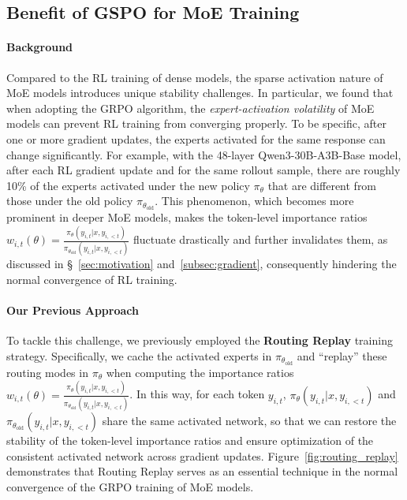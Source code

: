 \subsection{Benefit of GSPO for MoE Training}
\label{subsec:routing_replay}

\paragraph{Background}
Compared to the RL training of dense models, the sparse activation nature of MoE models introduces unique stability challenges. In particular, we found that when adopting the GRPO algorithm, the \textit{expert-activation volatility} of MoE models can prevent RL training from converging properly. To be specific, after one or more gradient updates, the experts activated for the same response can change significantly. For example, with the 48-layer Qwen3-30B-A3B-Base model, after each RL gradient update and for the same rollout sample, there are roughly 10\% of the experts activated under the new policy $\pi_{\theta}$ that are different from those under the old policy $\pi_{\theta_\text{old}}$.
This phenomenon, which becomes more prominent in deeper MoE models, makes the token-level importance ratios $w_{i,t}(\theta) = \frac{ \pi_{\theta} (y_{i,t} | x, y_{i,<t}) }{ \pi_{\theta_\text{old}} (y_{i,t} | x,y_{i,<t})}$ fluctuate drastically and further invalidates them, as discussed in \S~\ref{sec:motivation} and~\ref{subsec:gradient}, consequently hindering the normal convergence of RL training.

\paragraph{Our Previous Approach} To tackle this challenge, we previously employed the \textbf{Routing Replay} training strategy. Specifically, we cache the activated experts in $\pi_{\theta_\text{old}}$ and ``replay'' these routing modes in $\pi_{\theta}$ when computing the importance ratios $w_{i,t}(\theta) = \frac{ \pi_{\theta} (y_{i,t} | x, y_{i,<t}) }{ \pi_{\theta_\text{old}} (y_{i,t} | x,y_{i,<t})}$. In this way, for each token $y_{i,t}$, $\pi_{\theta} (y_{i,t} | x, y_{i,<t})$ and $\pi_{\theta_\text{old}} (y_{i,t} | x,y_{i,<t})$ share the same activated network, so that we can restore the stability of the token-level importance ratios and ensure optimization of the consistent activated network across gradient updates.
Figure~\ref{fig:routing_replay} demonstrates that Routing Replay serves as an essential technique in the normal convergence of the GRPO training of MoE models.

